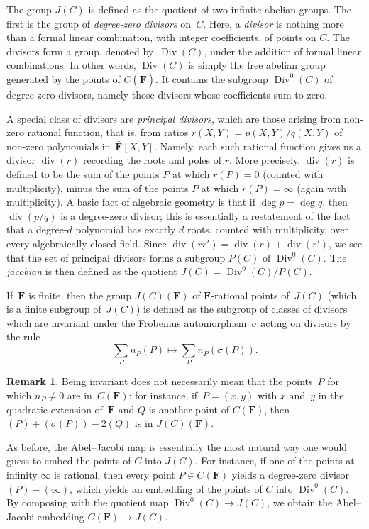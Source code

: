 \documentclass[12pt]{amsart}
\numberwithin{equation}{section}
\newcommand{\Ff}{\mathbf{F}}
\DeclareMathOperator{\Div}{Div}
\DeclareMathOperator{\divv}{div}
\theoremstyle{plain}
\theoremstyle{remark}
\theoremstyle{definition}
\newtheorem{remark}[theorem]{Remark}
\begin{document}
The group $J(C)$ is defined as the quotient of two infinite abelian
groups. The first is the group of \emph{degree-zero divisors}
on~$C$. Here, a \emph{divisor} is nothing more than a formal linear
combination, with integer coefficients, of points on $C$. The divisors
form a group, denoted by~$\Div(C)$, under the addition of formal linear
combinations. In other words, $\Div(C)$ is simply the free abelian
group generated by the points of $C(\bar{\Ff})$. It contains the
subgroup $\Div^0(C)$ of degree-zero divisors, namely those divisors
whose coefficients sum to zero.

A special class of divisors are \emph{principal divisors}, which are
those arising from non-zero rational function, that is, from ratios
$r(X,Y)=p(X,Y)/q(X,Y)$ of non-zero polynomials
in~$\bar{\Ff}[X,Y]$. Namely, each such rational function gives us a
divisor $\divv(r)$ recording the roots and poles of $r$. More
precisely, $\divv(r)$ is defined to be the sum of the points $P$ at
which \hbox{$r(P)=0$} (counted with multiplicity), minus the sum of the
points $P$ at which \hbox{$r(P)=\infty$} (again with multiplicity). A basic
fact of algebraic geometry is that if $\deg p=\deg q$, then
$\divv(p/q)$ is a degree-zero divisor; this is essentially a
restatement of the fact that a degree-$d$ polynomial has exactly $d$
roots, counted with multiplicity, over every algebraically closed
field. Since $\divv(rr') = \divv(r)+\divv(r')$, we see that the set of
principal divisors forms a subgroup $P(C)$ of $\Div^0(C)$. The
\emph{jacobian} is then defined as the quotient $J(C)=\Div^0(C)/P(C)$.

If~$\Ff$ is finite, then the group $J(C)(\Ff)$ of $\Ff$-rational
points of~$J(C)$ (which is a finite subgroup of~$J(C)$) is defined as
the subgroup of classes of divisors which are invariant under the
Frobenius automorphism~$\sigma$ acting on divisors by the rule
\[
  \sum_{P} n_P (P)\mapsto \sum_P n_P (\sigma(P)).
\]

\begin{remark}
  Being invariant does not necessarily mean that the points~$P$ for
  which $n_P\not=0$ are in~$C(\Ff)$: for instance, if~$P=(x,y)$ with
  $x$ and~$y$ in the quadratic extension of~$\Ff$ and $Q$ is another point of $C(\Ff)$, then
  $(P)+(\sigma(P))-2(Q)$ is in $J(C)(\Ff)$.
\end{remark}

As before, the Abel--Jacobi map is essentially the most natural way
one would guess to embed the points of $C$ into $J(C)$. For instance, if one of the points at infinity $\infty$ is rational, then every point $P \in C(\Ff)$
yields a degree-zero divisor $(P)-(\infty)$, which yields an embedding of
the points of $C$ into $\Div^0(C)$. By composing with the quotient map
$\Div^0(C) \to J(C)$, we obtain the Abel--Jacobi embedding $C(\Ff) \to
J(C)$.
\end{document}
